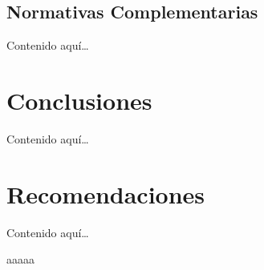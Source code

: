 \documentclass[14pt,letterpaper]{extarticle}
\begin{document}
	\subsection{Normativas Complementarias}
	Contenido aquí…
	
	\section*{Conclusiones}
	Contenido aquí…
	
	\section*{Recomendaciones}
	Contenido aquí…
	
	\newpage
	
	\renewcommand{\refname}{Referencias}
	
	aaaaa
	
\end{document}
